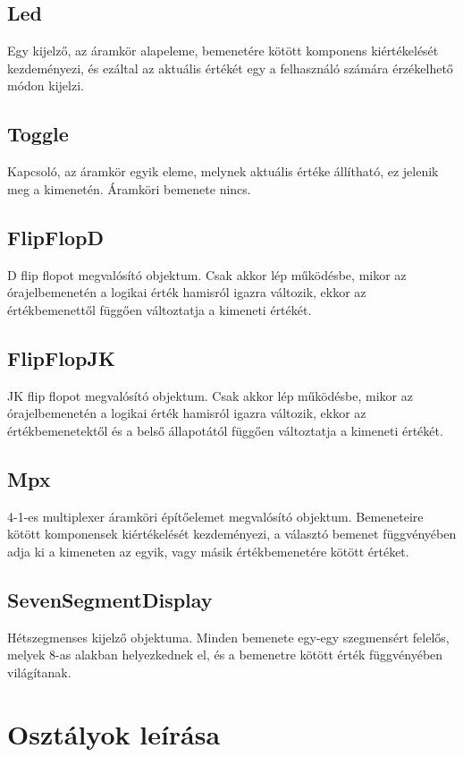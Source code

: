 \subsection{\bf Led}
Egy kijelző, az áramkör alapeleme, bemenetére kötött komponens kiértékelését kezdeményezi, és ezáltal az aktuális értékét egy a felhasználó számára érzékelhető módon kijelzi.

\subsection{\bf Toggle}
Kapcsoló, az áramkör egyik eleme, melynek aktuális értéke állítható, ez jelenik meg a kimenetén. Áramköri bemenete nincs.

\subsection{\bf FlipFlopD}
D flip flopot megvalósító objektum. Csak akkor lép működésbe, mikor az órajelbemenetén a logikai érték hamisról igazra változik, ekkor az értékbemenettől függően változtatja a kimeneti értékét.

\subsection{\bf FlipFlopJK}
JK flip flopot megvalósító objektum. Csak akkor lép működésbe, mikor az órajelbemenetén a logikai érték hamisról igazra változik, ekkor az értékbemenetektől és a belső állapotától függően változtatja a kimeneti értékét.

\subsection{\bf Mpx}
4-1-es multiplexer áramköri építőelemet megvalósító objektum. Bemeneteire kötött komponensek kiértékelését kezdeményezi, a választó bemenet függvényében adja ki a kimeneten az egyik, vagy másik értékbemenetére kötött értéket.

\subsection{\bf SevenSegmentDisplay}
Hétszegmenses kijelző objektuma. Minden bemenete egy-egy szegmensért felelős, melyek 8-as alakban helyezkednek el, és a bemenetre kötött érték függvényében világítanak.

\section{Osztályok leírása}

